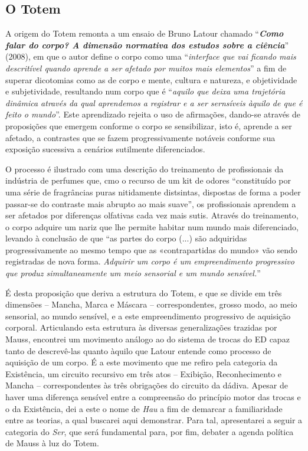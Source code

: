 \subsection{O Totem}

A origem do Totem remonta a um ensaio de Bruno Latour chamado \enquote{\textit{\textbf{Como falar do corpo? A dimensão normativa dos estudos sobre a ciência}}} (2008), em que o autor define o corpo como uma \enquote{\textit{interface que vai ficando mais descritível quando aprende a ser afetado por muitos mais elementos}} a fim de superar dicotomias como as de corpo e mente, cultura e natureza, e objetividade e subjetividade, resultando num corpo que é \enquote{\textit{aquilo que deixa uma trajetória dinâmica através da qual aprendemos a registrar e a ser sernsíveis àquilo de que é feito o mundo}}.
Este aprendizado rejeita o uso de afirmações, dando-se através de proposições que emergem conforme o corpo se sensibilizar, isto é, aprende a ser afetado, a contrastes que se fazem progressivamente notáveis conforme sua exposição sucessiva a cenários sutilmente diferenciados.

O processo é ilustrado com uma descrição do treinamento de profissionais da indústria de perfumes que, cmo o recurso de um kit de odores \enquote{constituído por uma série de fragrâncias puras nitidamente distsintas, dispostas de forma a poder passar-se do contraste mais abrupto ao mais suave}, os profissionais aprendem a ser afetados por diferenças olfativas cada vez mais sutis.
Através do treinamento, o corpo adquire um nariz que lhe permite habitar num mundo mais diferenciado, levando à conclusão de que \enquote{as partes do corpo (...) são adquiridas progressivamente ao mesmo tempo que as «contrapartidas do mundo» vão sendo registradas de nova forma. \textit{Adquirir um corpo é um empreendimento progressivo que produz simultaneamente um meio sensorial e um mundo sensível.}}

É desta proposição que deriva a estrutura do Totem, e que se divide em três dimensões -- Mancha, Marca e Máscara -- correspondentes, grosso modo, ao meio sensorial, ao mundo sensível, e a este empreendimento progressivo de aquisição corporal.
Articulando esta estrutura às diversas generalizações trazidas por Mauss, encontrei um movimento análogo ao do sistema de trocas do ED capaz tanto de descrevê-las quanto àquilo que Latour entende como processo de aquisição de um corpo.
É a este movimento que me refiro pela categoria da Existência, um circuito recursivo em três atos -- Exibição, Reconhecimento e Mancha -- correspondentes às três obrigações do circuito da dádiva.
Apesar de haver uma diferença sensível entre a compreensão do princípio motor das trocas e o da Existência, dei a este o nome de \textit{Hau} a fim de demarcar a familiaridade entre as teorias, a qual buscarei aqui demonstrar.
Para tal, apresentarei a seguir a categoria do \textit{Ser}, que será fundamental para, por fim, debater a agenda política de Mauss à luz do Totem.

